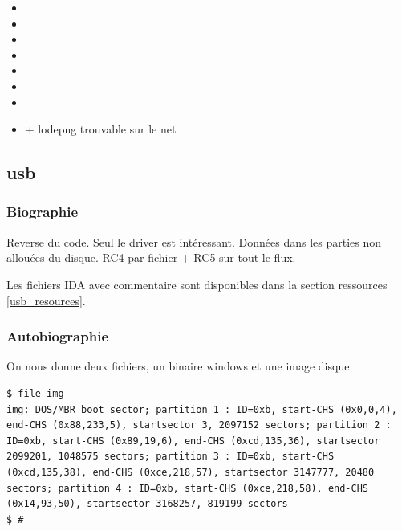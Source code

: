 \documentclass[14pt]{article}
\begin{document}
\begin{itemize}
\item {}
\item {}
\item {}
\item {}
\item {}
\item {}
\item {}
\item + lodepng trouvable sur le net
\end{itemize}


\subsection{usb}
\subsubsection{Biographie}
Reverse du code. Seul le driver est intéressant.
Données dans les parties non allouées du disque.
RC4 par fichier + RC5 sur tout le flux.

Les fichiers IDA avec commentaire sont disponibles dans la section ressources \ref{usb_resources}.
\subsubsection{Autobiographie}

On nous donne deux fichiers, un binaire windows et une image disque.

\begin{verbatim}
$ file img
img: DOS/MBR boot sector; partition 1 : ID=0xb, start-CHS (0x0,0,4), end-CHS (0x88,233,5), startsector 3, 2097152 sectors; partition 2 : ID=0xb, start-CHS (0x89,19,6), end-CHS (0xcd,135,36), startsector 2099201, 1048575 sectors; partition 3 : ID=0xb, start-CHS (0xcd,135,38), end-CHS (0xce,218,57), startsector 3147777, 20480 sectors; partition 4 : ID=0xb, start-CHS (0xce,218,58), end-CHS (0x14,93,50), startsector 3168257, 819199 sectors
$ #
\end{verbatim}
\end{document}
